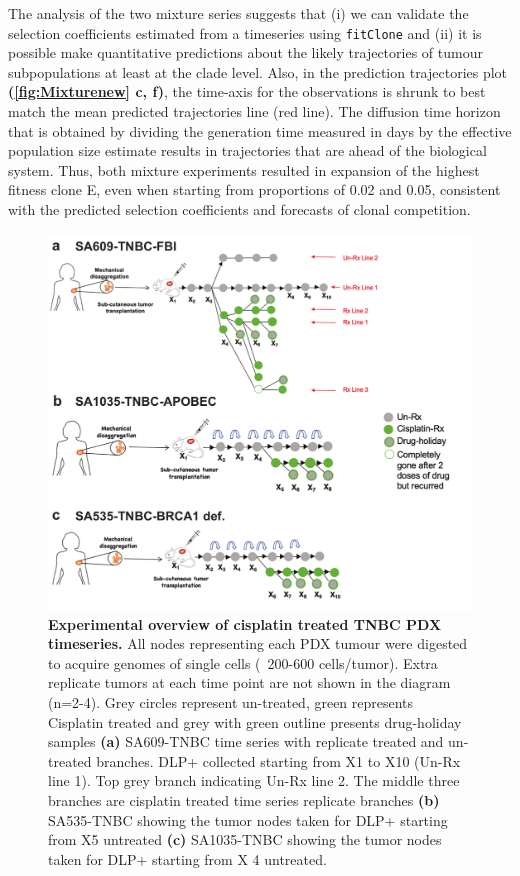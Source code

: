 The analysis of the two mixture series suggests that (i) we can validate the selection coefficients estimated from a timeseries using \texttt{fitClone} and (ii) it is possible make quantitative predictions about the likely trajectories of tumour subpopulations at least at the clade level. Also, in the prediction trajectories plot \textbf{(\autoref{fig:Mixturenew} c, f)}, the time-axis for the observations is shrunk to best match the mean predicted trajectories line (red line). The diffusion time horizon that is obtained by dividing the generation time measured in days by the effective population size estimate results in trajectories that are ahead of the biological system.
Thus, both mixture experiments resulted in expansion of the highest fitness clone E, even when starting from proportions of 0.02 and 0.05, consistent with the predicted selection coefficients and forecasts of clonal competition.

\begin{figure}
\centering
\includegraphics[width=\textwidth]{Figures/chap4/treatedtimeseriesgreen.pdf}

\caption[Experimental overview of TNBC PDX treated time series]
	{\small
	\textbf{Experimental overview of cisplatin treated TNBC PDX timeseries.}
	      All nodes representing each PDX tumour were digested to acquire genomes of single cells (~200-600 cells/tumor). Extra replicate tumors at each time point are not shown in the diagram (n=2-4). Grey circles represent un-treated, green represents Cisplatin treated and grey with green outline presents drug-holiday samples \textbf{(a)} SA609-TNBC time series with replicate treated and un-treated branches. DLP+ collected starting from X1 to X10 (Un-Rx line 1). Top grey branch indicating Un-Rx line 2. The middle three branches are cisplatin treated time series replicate branches \textbf{(b)} SA535-TNBC showing the tumor nodes taken for DLP+ starting from X5 untreated \textbf{(c)} SA1035-TNBC showing the tumor nodes taken for DLP+ starting from X 4 untreated.}
	
	\label{fig:treatedtimeseriesgreen}
\end{figure}

